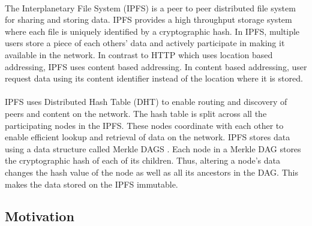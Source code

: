 \documentclass{article}
\begin{document}
        \paragraph{}
        The Interplanetary File System (IPFS) \cite{IPFS} is a peer to peer distributed file system for sharing and storing data. IPFS provides a high throughput storage system where each file is uniquely identified by a cryptographic hash. In IPFS, multiple users store a piece of each others' data and actively participate in making it available in the network. In contrast to HTTP which uses location based addressing, IPFS uses content based addressing. In content based addressing, user request data using its content identifier instead of the location where it is stored.

        \paragraph{}
        IPFS uses Distributed Hash Table (DHT) \cite{DHT} to enable routing and discovery of peers and content on the network. The hash table is split across all the participating nodes in the IPFS. These nodes coordinate with each other to enable efficient lookup and retrieval of data on the network. IPFS stores data using a data structure called Merkle DAGS \cite{IPFS}. Each node in a Merkle DAG stores the cryptographic hash of each of its children. Thus, altering a node's data changes the hash value of the node as well as all its ancestors in the DAG. This makes the data stored on the IPFS immutable.
        
    \subsection{Motivation}
\end{document}

